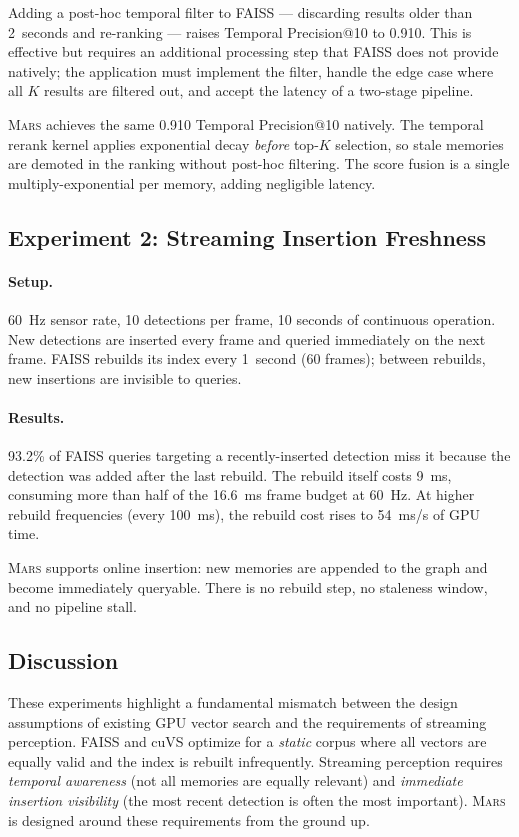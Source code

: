 \documentclass[11pt]{article}
\newcommand{\mars}{\textsc{Mars}}
\begin{document}
Adding a post-hoc temporal filter to FAISS --- discarding results older
than 2~seconds and re-ranking --- raises Temporal Precision@10 to 0.910.
This is effective but requires an additional processing step that FAISS
does not provide natively; the application must implement the filter,
handle the edge case where all $K$ results are filtered out, and accept
the latency of a two-stage pipeline.

\mars{} achieves the same 0.910 Temporal Precision@10 natively. The
temporal rerank kernel applies exponential decay \emph{before} top-$K$
selection, so stale memories are demoted in the ranking without
post-hoc filtering. The score fusion is a single multiply-exponential
per memory, adding negligible latency.

\subsection{Experiment 2: Streaming Insertion Freshness}
\label{sec:streaming}

\paragraph{Setup.} 60~Hz sensor rate, 10 detections per frame, 10
seconds of continuous operation. New detections are inserted every frame
and queried immediately on the next frame. FAISS rebuilds its index
every 1~second (60 frames); between rebuilds, new insertions are
invisible to queries.

\paragraph{Results.} 93.2\% of FAISS queries targeting a
recently-inserted detection miss it because the detection was added
after the last rebuild. The rebuild itself costs 9~ms, consuming more
than half of the 16.6~ms frame budget at 60~Hz. At higher rebuild
frequencies (every 100~ms), the rebuild cost rises to 54~ms/s of GPU
time.

\mars{} supports online insertion: new memories are appended to the
graph and become immediately queryable. There is no rebuild step, no
staleness window, and no pipeline stall.

\subsection{Discussion}

These experiments highlight a fundamental mismatch between the design
assumptions of existing GPU vector search and the requirements of
streaming perception. FAISS and cuVS optimize for a \emph{static} corpus
where all vectors are equally valid and the index is rebuilt
infrequently. Streaming perception requires \emph{temporal awareness}
(not all memories are equally relevant) and \emph{immediate insertion
visibility} (the most recent detection is often the most important).
\mars{} is designed around these requirements from the ground up.
\end{document}
